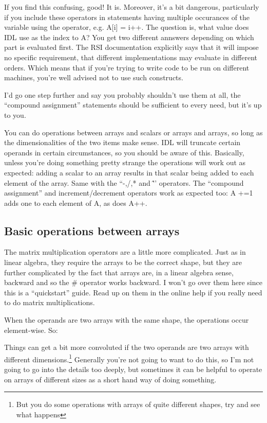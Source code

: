   If you find this confusing, good! It is. Moreover, it's a bit
  dangerous, particularly if you include these operators in statements
  having multiple occurances of the variable using the operator,
  e.g. A[i] = i++. The question is, what value does IDL use as the
  index to A? You get two different annswers depending on which part
  is evaluated first. The RSI documentation explicitly says that it
  will impose no specific requirement, that different implementations
  may evaluate in different orders. Which means that if you're trying
  to write code to be run on different machines, you're well advised
  not to use such constructs.

  I'd go one step further and say you probably shouldn't use them at
  all, the ``compound assignment'' statements should be sufficient to
  every need, but it's up to you.


  You can do operations between arrays and scalars or arrays and
  arrays, so long as the dimensionalities of the two items make
  sense. IDL will truncate certain operands in certain circumstances,
  so you should be aware of this. Basically, unless you're doing
  something pretty strange the operations will work out as expected:
  adding a scalar to an array results in that scalar being added to
  each element of the array. Same with the ``-,/,* and \^''
  operators. The ``compound assignment'' and increment/decrement
  operators work as expected too: A +=1 adds one to each element of A,
  as does A++.

  \subsection{Basic operations between arrays}\label{ref-array-basic-ops}

  The matrix multiplication operators are a little more complicated.
  Just as in linear algebra, they require the arrays to be the correct
  shape, but they are further complicated by the fact that arrays are,
  in a linear algebra sense, backward and so the \# operator works
  backward.  I won't go over them here since this is a ``quickstart''
  guide. Read up on them in the online help if you really need to do
  matrix multiplications.

  When the operands are two arrays with the same shape, the
  operations occur element-wise. So:


  Things can get a bit more convoluted if the two operands are two
  arrays with different dimensions.\footnote{But you  do
  some operations with arrays of quite different shapes, try
   and
  see what happens} Generally you're not going to want to do this, so
  I'm not going to go into the details too deeply, but sometimes it
  can be helpful to operate on arrays of different sizes as a short
  hand way of doing something.

